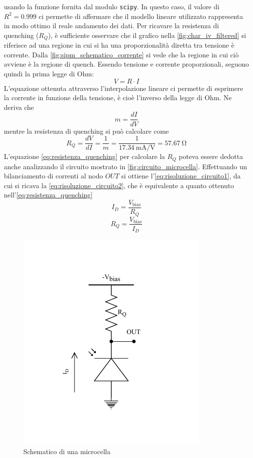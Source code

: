 usando la funzione fornita dal modulo \texttt{scipy}. In questo caso, il valore di $R^2=0.999$ ci permette di affermare che il modello
lineare utilizzato rappresenta in modo ottimo il reale andamento dei dati.
Per ricavare la resistenza di quenching ($R_Q$), è sufficiente osservare che il grafico nella \autoref*{fig:char_iv_filtered} si riferisce ad una regione
in cui si ha una proporzionalità diretta tra tensione è corrente. Dalla \autoref*{fig:sipm_schematico_corrente} si vede che la regione in cui ciò
avviene è la regione di quench. Essendo tensione e corrente proporzionali, seguono quindi la prima legge di Ohm:
\begin{equation}
    V = R \cdot I
    \label{eq:legge_ohm}
\end{equation}
L'equazione ottenuta attraverso l'interpolazione lineare ci permette di esprimere la corrente in funzione della tensione, è cioè l'inverso
della legge di Ohm. Ne deriva che
\begin{equation}
    m = \frac{dI}{dV}
    \label{eq:slope}
\end{equation}
mentre la resistenza di quenching si può calcolare come
\begin{equation}
    R_Q= \frac{dV}{dI}=\frac{1}{m}=\frac{1}{\SI{17,34}{\milli\ampere/\volt}}=\SI{57,67}{\ohm}
    \label{eq:resistenza_quenching}
\end{equation}
L'equazione \autoref*{eq:resistenza_quenching} per calcolare la $R_Q$ poteva essere dedotta anche analizzando il circuito mostrato in 
\autoref*{fig:circuito_microcella}. Effettuando un bilanciamento di correnti al nodo $OUT$ si ottiene l'\autoref*{eq:risoluzione_circuito1}, 
da cui si ricava la \autoref*{eq:risoluzione_circuito2}, che è equivalente a quanto ottenuto nell'\autoref*{eq:resistenza_quenching}
\begin{equation}
    I_D=\frac{V_\text{bias}}{R_Q}
    \label{eq:risoluzione_circuito1}
\end{equation}
\begin{equation}
    R_Q=\frac{V_\text{bias}}{I_D}
    \label{eq:risoluzione_circuito2}
\end{equation}
\begin{figure}[h!]
    \centering
    \includegraphics[width=0.65\linewidth]{img/circuito_microcella.pdf}
    \caption{Schematico di una microcella}
    \label{fig:circuito_microcella}
\end{figure}
